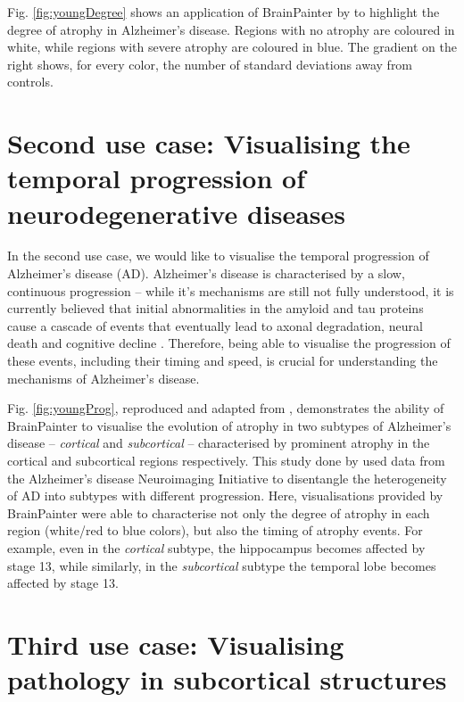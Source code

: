 \documentclass{llncs}
\begin{document}
Fig. \ref{fig:youngDegree} shows an application of BrainPainter by \cite{young2018uncovering} to highlight the degree of atrophy in Alzheimer's disease. Regions with no atrophy are coloured in white, while regions with severe atrophy are coloured in blue. The gradient on the right shows, for every color, the number of standard deviations away from controls.


\section{Second use case: Visualising the temporal progression of neurodegenerative diseases}
\label{progression}

In the second use case, we would like to visualise the temporal progression of Alzheimer's disease (AD). Alzheimer's disease is characterised by a slow, continuous progression -- while it's mechanisms are still not fully understood, it is currently believed that initial abnormalities in the amyloid and tau proteins cause a cascade of events that eventually lead to axonal degradation, neural death and cognitive decline \cite{mudher2002alzheimer}. Therefore, being able to visualise the progression of these events, including their timing and speed, is crucial for understanding the mechanisms of Alzheimer's disease. 


Fig. \ref{fig:youngProg}, reproduced and adapted from \cite{young2018uncovering}, demonstrates the ability of BrainPainter to visualise the evolution of atrophy in two subtypes of Alzheimer's disease -- \emph{cortical} and \emph{subcortical} -- characterised by prominent atrophy in the cortical and subcortical regions respectively. This study done by \cite{young2018uncovering} used data from the Alzheimer's disease Neuroimaging Initiative to disentangle the heterogeneity of AD into subtypes with different progression. Here, visualisations provided by BrainPainter were able to characterise not only the degree of atrophy in each region (white/red to blue colors), but also the timing of atrophy events. For example, even in the \emph{cortical} subtype, the hippocampus becomes affected by stage 13, while similarly, in the \emph{subcortical} subtype the temporal lobe becomes affected by stage 13. 


\section{Third use case: Visualising pathology in subcortical structures}
\label{progression}
\end{document}
